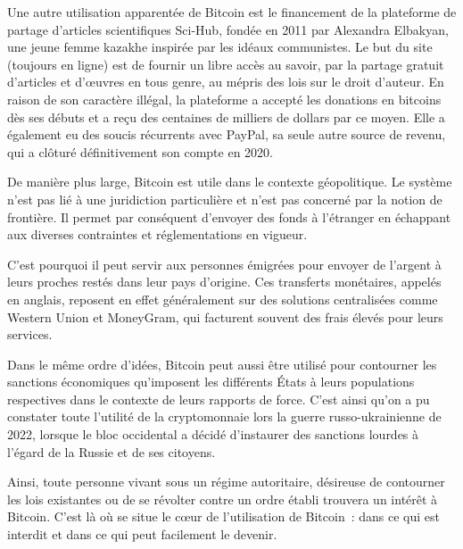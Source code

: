 Une autre utilisation apparentée de Bitcoin est le financement de la plateforme de partage d'articles scientifiques Sci-Hub, fondée en 2011 par Alexandra Elbakyan, une jeune femme kazakhe inspirée par les idéaux communistes. Le but du site (toujours en ligne) est de fournir un libre accès au savoir, par la partage gratuit d'articles et d'œuvres en tous genre, au mépris des lois sur le droit d'auteur. En raison de son caractère illégal, la plateforme a accepté les donations en bitcoins dès ses débuts et a reçu des centaines de milliers de dollars par ce moyen. Elle a également eu des soucis récurrents avec PayPal, sa seule autre source de revenu, qui a clôturé définitivement son compte en 2020.

De manière plus large, Bitcoin est utile dans le contexte géopolitique. Le système n'est pas lié à une juridiction particulière et n'est pas concerné par la notion de frontière. Il permet par conséquent d'envoyer des fonds à l'étranger en échappant aux diverses contraintes et réglementations en vigueur.

C'est pourquoi il peut servir aux personnes émigrées pour envoyer de l'argent à leurs proches restés dans leur pays d'origine. Ces transferts monétaires, appelés  en anglais, reposent en effet généralement sur des solutions centralisées comme Western Union et MoneyGram, qui facturent souvent des frais élevés pour leurs services. %

Dans le même ordre d'idées, Bitcoin peut aussi être utilisé pour contourner les sanctions économiques qu'imposent les différents États à leurs populations respectives dans le contexte de leurs rapports de force. C'est ainsi qu'on a pu constater toute l'utilité de la cryptomonnaie lors la guerre russo-ukrainienne de 2022, lorsque le bloc occidental a décidé d'instaurer des sanctions lourdes à l'égard de la Russie et de ses citoyens.

Ainsi, toute personne vivant sous un régime autoritaire, désireuse de contourner les lois existantes ou de se révolter contre un ordre établi trouvera un intérêt à Bitcoin. C'est là où se situe le cœur de l'utilisation de Bitcoin~: dans ce qui est interdit et dans ce qui peut facilement le devenir.

